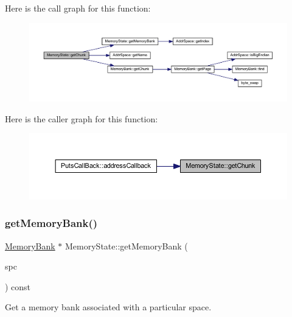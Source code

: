 Here is the call graph for this function\+:
\nopagebreak
\begin{figure}[H]
\begin{center}
\leavevmode
\includegraphics[width=350pt]{class_memory_state_ab8ea70436398ce942b25366b71b26506_cgraph}
\end{center}
\end{figure}
Here is the caller graph for this function\+:
\nopagebreak
\begin{figure}[H]
\begin{center}
\leavevmode
\includegraphics[width=350pt]{class_memory_state_ab8ea70436398ce942b25366b71b26506_icgraph}
\end{center}
\end{figure}
\mbox{\label{class_memory_state_abf51909f3b3b47db085f754680445b62}} 
\subsubsection{\texorpdfstring{getMemoryBank()}{getMemoryBank()}}
{\footnotesize\ttfamily \mbox{\hyperlink{class_memory_bank}{Memory\+Bank}} $\ast$ Memory\+State\+::get\+Memory\+Bank (\begin{DoxyParamCaption}\item[{\mbox{\hyperlink{class_addr_space}{Addr\+Space}} $\ast$}]{spc }\end{DoxyParamCaption}) const}



Get a memory bank associated with a particular space. 

